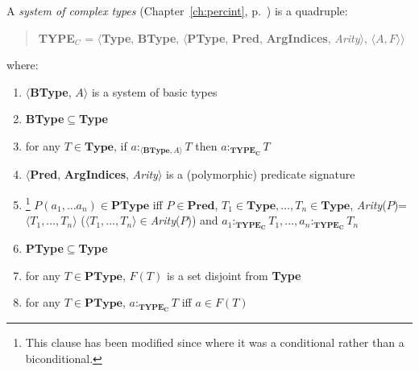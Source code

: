 A {\it system of complex types\/} (Chapter~\ref{ch:percint},
p.~\pageref{ex:comp-types}) is a quadruple:
\begin{quote}
{\bf TYPE$_C$} = $\langle${\bf Type}, {\bf BType},
$\langle$\textbf{PType}, {\bf Pred}, \textbf{ArgIndices}, {\it Arity\/}$\rangle$, $\langle A,F\rangle$$\rangle$
\end{quote}
where:  
\begin{enumerate} 
 
\item $\langle$\textbf{BType}, $A$$\rangle$ is a system of basic types 
 
\item \textbf{BType}$\subseteq$\textbf{Type}

\item for any $T\in\textbf{Type}$, if $a:_{\langle\mathbf{BType},
    A\rangle}T$ then $a:_{\mathbf{TYPE_C}}T$

\item \label{cl:predtypes}$\langle${\bf Pred}, \textbf{ArgIndices},
  {\it Arity\/}$\rangle$ is a (polymorphic) predicate
  signature

\item\hspace*{-1ex}\footnote{This clause has been modified since
    \cite{Cooper2012} where it was a conditional rather than a biconditional.} %
  $P(a_1,\ldots a_n)\in\textbf{PType}$ iff $P\in\textbf{Pred}$, $T_1\in \mathbf{Type},\ldots,T_n\in
  \mathbf{Type}$, \textit{Arity}($P$)=$\langle
  T_1,\ldots,T_n\rangle$  ($\langle
  T_1,\ldots,T_n\rangle$$\in$\textit{Arity}($P$)) and $a_1:_{\mathbf{TYPE_C}}T_1,\ldots,a_n:_{\mathbf{TYPE_C}}T_n$




\item \textbf{PType}$\subseteq$\textbf{Type}

\item for any $T\in\textbf{PType}$, $F(T)$ is a set disjoint from \textbf{Type}

\item for any $T\in\textbf{PType}$, $a:_{\mathbf{TYPE_C}}T$ iff $a\in F(T)$
 
\end{enumerate}

